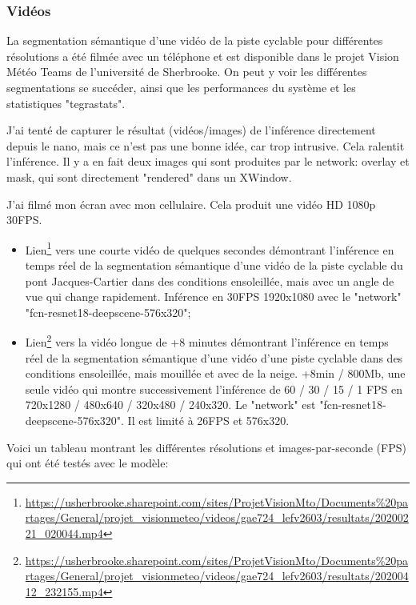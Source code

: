 \subsubsection{Vidéos}
\par La segmentation sémantique d'une vidéo de la piste cyclable pour différentes résolutions a été filmée avec un téléphone et est disponible dans le projet Vision Météo Teams de l'université de Sherbrooke. On peut y voir les différentes segmentations se succéder, ainsi que les performances du système et les statistiques "tegrastats". 
\par J'ai tenté de capturer le résultat (vidéos/images) de l'inférence directement depuis le nano, mais ce n'est pas une bonne idée, car trop intrusive. Cela ralentit l'inférence. Il y a en fait deux images qui sont produites par le network: overlay et mask, qui sont directement "rendered" dans un XWindow. 
\par J'ai filmé mon écran avec mon cellulaire. Cela produit une vidéo HD 1080p 30FPS. 
\begin{itemize}
   \item Lien\footnote{\url{https://usherbrooke.sharepoint.com/sites/ProjetVisionMto/Documents\%20partages/General/projet_visionmeteo/videos/gae724_lefv2603/resultats/20200221_020044.mp4}} vers une courte vidéo de quelques secondes démontrant l'inférence en temps réel de la segmentation sémantique d'une vidéo de la piste cyclable du pont Jacques-Cartier dans des conditions ensoleillée, mais avec un angle de vue qui change rapidement. Inférence en 30FPS 1920x1080 avec le "network" "fcn-resnet18-deepscene-576x320";
   \item Lien\footnote{\url{https://usherbrooke.sharepoint.com/sites/ProjetVisionMto/Documents\%20partages/General/projet_visionmeteo/videos/gae724_lefv2603/resultats/20200412_232155.mp4}} vers la vidéo longue de +8 minutes démontrant l'inférence en temps réel de la segmentation sémantique d'une vidéo d'une piste cyclable dans des conditions ensoleillée, mais mouillée et avec de la neige. +8min / 800Mb, une seule vidéo qui montre successivement l'inférence de 60 / 30 / 15 / 1 FPS en 720x1280 / 480x640 / 320x480 / 240x320. Le "network" est "fcn-resnet18-deepscene-576x320". Il est limité à 26FPS et 576x320.
\end{itemize}
\par Voici un tableau montrant les différentes résolutions et images-par-seconde (FPS) qui ont été testés avec le modèle:
